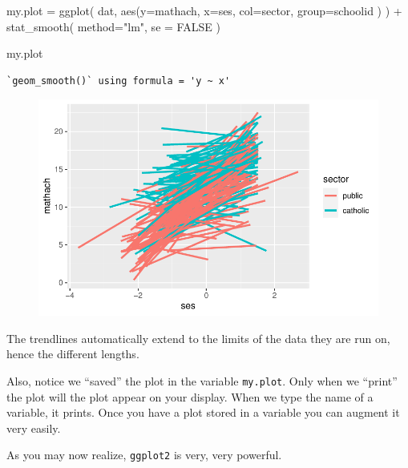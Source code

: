 \documentclass[
  letterpaper,
  DIV=11,
  numbers=noendperiod]{scrreprt}
\newenvironment{Shaded}{\begin{snugshade}}{\end{snugshade}}
\newcommand{\AttributeTok}[1]{\textcolor[rgb]{0.49,0.56,0.16}{#1}}
\newcommand{\ConstantTok}[1]{\textcolor[rgb]{0.53,0.00,0.00}{#1}}
\newcommand{\FunctionTok}[1]{\textcolor[rgb]{0.02,0.16,0.49}{#1}}
\newcommand{\NormalTok}[1]{\textcolor[rgb]{0.00,0.44,0.13}{#1}}
\newcommand{\OtherTok}[1]{\textcolor[rgb]{0.00,0.44,0.13}{#1}}
\newcommand{\SpecialCharTok}[1]{\textcolor[rgb]{0.25,0.44,0.63}{#1}}
\newcommand{\StringTok}[1]{\textcolor[rgb]{0.25,0.44,0.63}{#1}}
\begin{document}
\begin{Shaded}
\begin{Highlighting}[]
\NormalTok{my.plot }\OtherTok{=} \FunctionTok{ggplot}\NormalTok{( dat, }\FunctionTok{aes}\NormalTok{(}\AttributeTok{y=}\NormalTok{mathach, }\AttributeTok{x=}\NormalTok{ses, }\AttributeTok{col=}\NormalTok{sector, }\AttributeTok{group=}\NormalTok{schoolid ) ) }\SpecialCharTok{+} 
    \FunctionTok{stat\_smooth}\NormalTok{( }\AttributeTok{method=}\StringTok{"lm"}\NormalTok{, }\AttributeTok{se =} \ConstantTok{FALSE}\NormalTok{ )}

\NormalTok{my.plot}
\end{Highlighting}
\end{Shaded}

\begin{verbatim}
`geom_smooth()` using formula = 'y ~ x'
\end{verbatim}

\begin{figure}[H]

{\centering \includegraphics{intro_ggplot_files/figure-pdf/unnamed-chunk-6-1.pdf}

}

\end{figure}

The trendlines automatically extend to the limits of the data they are
run on, hence the different lengths.

Also, notice we ``saved'' the plot in the variable \texttt{my.plot}.
Only when we ``print'' the plot will the plot appear on your display.
When we type the name of a variable, it prints. Once you have a plot
stored in a variable you can augment it very easily.

As you may now realize, \texttt{ggplot2} is very, very powerful.
\end{document}
